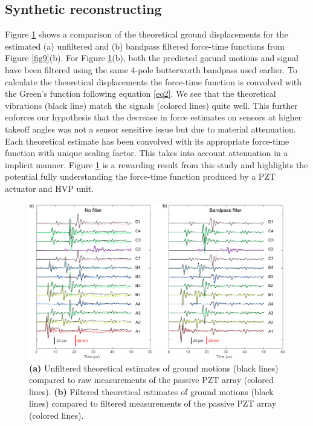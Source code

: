 \documentclass[preprint,3p, 11pt,authoryear]{elsarticle}
\begin{document}
\subsection{Synthetic reconstructing}
Figure \ref{fig10} shows a comparison of the theoretical ground displacements for the estimated (a) unfiltered and (b) bandpass filtered force-time functions from Figure \ref{fig9}(b). For Figure \ref{fig10}(b), both the predicted gorund motions and signal have been filtered using the same 4-pole butterworth bandpass used earlier. To calculate the theoretical displacements the force-time function is convolved with the Green's function following equation \eqref{eq2}. We see that the theoretical vibrations (black line) match the signals (colored lines) quite well. This further enforces our hypothesis that the decrease in force estimates on sensors at higher takeoff angles was not a sensor sensitive issue but due to material attenuation. Each theoretical estimate has been convolved with its appropriate force-time function with unique scaling factor. This takes into account attenuation in a implicit manner.  Figure \ref{fig10} is a rewarding result from this study and highlights the potential fully understanding the force-time function produced by a PZT actuator and HVP unit.  

\begin{figure}[ht]
     	\centering
\includegraphics[scale= 1]{FIG10.pdf} 
\caption{\textbf{(a)} Unfiltered theoretical estimates of ground motions (black lines) compared to raw measurements of the passive PZT array (colored lines). \textbf{(b)} Filtered theoretical estimates of ground motions (black lines) compared to filtered measurements of the passive PZT array (colored lines). }
	\label{fig10} 
\end{figure}
\end{document}
